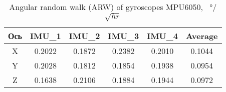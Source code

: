 \begin{table}[h!]
	\centering
	\caption{Angular random walk (ARW) of gyroscopes MPU6050, \SI[per-mode=symbol]{}{\degree}/$\sqrt{hr}$}
	\begin{tabular}{| c | c | c | c | c | c |}
	\hline
	Ось & IMU\_1 & IMU\_2 & IMU\_3 & IMU\_4 & Average \\ \hline
	X & 0.2022 & 0.1872 & 0.2382 & 0.2010 & 0.1044 \\ \hline
	Y & 0.2028 & 0.1812 & 0.1854 & 0.1938 & 0.0954 \\ \hline
	Z & 0.1638 & 0.2106 & 0.1884 & 0.1944 & 0.0972 \\
	\hline
	\end{tabular}
	\label{table:gyro_arw}
\end{table}

